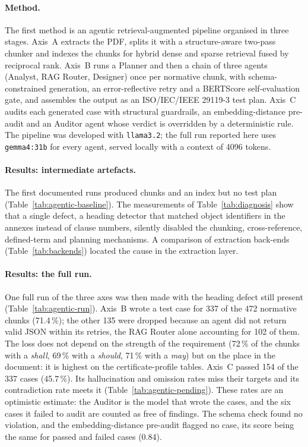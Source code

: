 \paragraph{Method.}
The first method is an agentic retrieval-augmented pipeline organised in
three stages. Axis~A extracts the PDF, splits it with a structure-aware
two-pass chunker and indexes the chunks for hybrid dense and sparse retrieval
fused by reciprocal rank. Axis~B runs a Planner and then a chain of three
agents (Analyst, RAG Router, Designer) once per normative chunk, with
schema-constrained generation, an error-reflective retry and a BERTScore
self-evaluation gate, and assembles the output as an ISO/IEC/IEEE 29119-3
test plan. Axis~C audits each generated case with structural guardrails, an
embedding-distance pre-audit and an Auditor agent whose verdict is overridden
by a deterministic rule. The pipeline was developed with \texttt{llama3.2};
the full run reported here uses \texttt{gemma4:31b} for every agent, served
locally with a context of 4096 tokens.

\paragraph{Results: intermediate artefacts.}
The first documented runs produced chunks and an index but no test plan
(Table~\ref{tab:agentic-baseline}). The measurements of
Table~\ref{tab:diagnosis} show that a single defect, a heading detector that
matched object identifiers in the annexes instead of clause numbers, silently
disabled the chunking, cross-reference, defined-term and planning mechanisms.
A comparison of extraction back-ends (Table~\ref{tab:backends}) located the
cause in the extraction layer.

\paragraph{Results: the full run.}
One full run of the three axes was then made with the heading defect still
present (Table~\ref{tab:agentic-run}). Axis~B wrote a test case for 337 of
the 472 normative chunks (71.4\,\%); the other 135 were dropped because an
agent did not return valid JSON within its retries, the RAG Router alone
accounting for 102 of them. The loss does not depend on the strength of the
requirement (72\,\% of the chunks with a \emph{shall}, 69\,\% with a
\emph{should}, 71\,\% with a \emph{may}) but on the place in the document: it
is highest on the certificate-profile tables. Axis~C passed 154 of the 337
cases (45.7\,\%). Its hallucination and omission rates miss their targets and
its contradiction rate meets it (Table~\ref{tab:agentic-pending}). These rates
are an optimistic estimate: the Auditor is the model that wrote the cases, and
the six cases it failed to audit are counted as free of findings. The schema
check found no violation, and the embedding-distance pre-audit flagged no
case, its score being the same for passed and failed cases (0.84).

